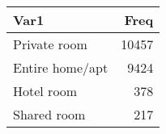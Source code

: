 
\begin{tabular}[t]{lr}
\toprule
Var1 & Freq\\
\midrule
Private room & 10457\\
Entire home/apt & 9424\\
Hotel room & 378\\
Shared room & 217\\
\bottomrule
\end{tabular}